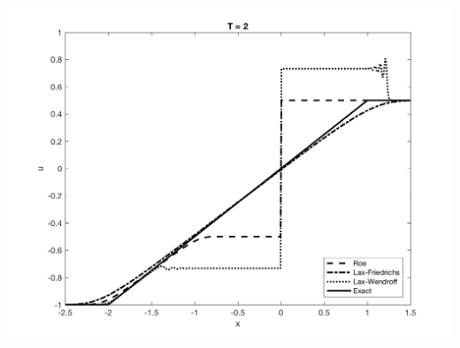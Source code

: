 \documentclass[11pt, oneside]{article}
\begin{document}
\begin{enumerate}
\begin{center}
      \includegraphics[scale=0.5]{Figures/03_03.png}
    \end{center}

\end{enumerate}
\end{document}
